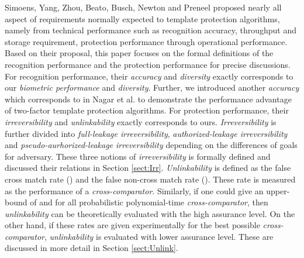 Simoens, Yang, Zhou, Beato, Busch, Newton and Preneel\cite{SYZBBNP2012} proposed nearly all aspect of requirements normally expected to template protection algorithms, namely from technical performance such as recognition accuracy, throughput and storage requirement, protection performance through operational performance. Based on their proposal,  this paper focuses on the formal definitions of the recognition performance and the protection performance for precise discussions. For recognition performance,  their {\it accuracy}\cite{SYZBBNP2012} and {\it diversity}\cite{SYZBBNP2012} exactly corresponds to our {\it biometric performance} and {\it diversity}. Further, we introduced another {\it accuracy} which corresponds to  in Nagar et al.\cite{Nagar:2010tg} to demonstrate the performance advantage of two-factor template protection algorithms. For protection performance, their {\it irreversibility}\cite{SYZBBNP2012}  and {\it unlinkability}\cite{SYZBBNP2012} exactly corresponds to ours. {\it Irreversibility}\cite{SYZBBNP2012}  is further divided into {\it full-leakage irreversibility}, {\it authorized-leakage irreversibility} and {\it pseudo-aurhorized-leakage irreversibility} depending on the differences of goals for adversary. These three notions of {\it irreversibility} is formally defined and discussed their relations in Section \ref{sect:Irr}. {\it Unlinkability}\cite{SYZBBNP2012} is defined as the false cross match rate () and the false non-cross match rate (). These rate is measured as the performance of a {\it cross-comparator}. Similarly, if one could give an upper-bound of  and  for all probabilistic polynomial-time  {\it cross-comparator}, then {\it unlinkability} can be theoretically evaluated with the high assurance level. On the other hand, if these rates are given experimentally for the best possible  {\it cross-comparator},  {\it unlinkability} is evaluated with lower assurance level. These are discussed in more detail in Section \ref{sect:Unlink}.
